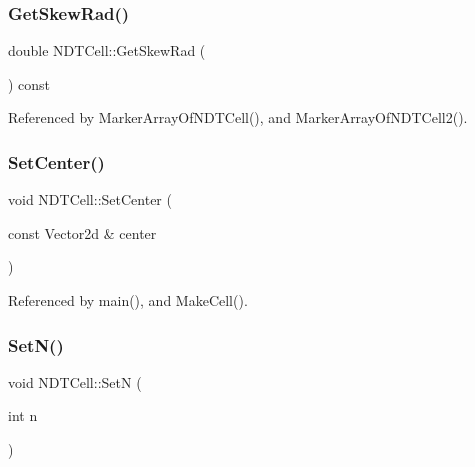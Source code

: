 \subsubsection{\texorpdfstring{Get\+Skew\+Rad()}{GetSkewRad()}}
{\footnotesize\ttfamily double N\+D\+T\+Cell\+::\+Get\+Skew\+Rad (\begin{DoxyParamCaption}{ }\end{DoxyParamCaption}) const\hspace{0.3cm}{\ttfamily [inline]}}



Referenced by Marker\+Array\+Of\+N\+D\+T\+Cell(), and Marker\+Array\+Of\+N\+D\+T\+Cell2().

\mbox{\label{classNDTCell_aa99d66a755f591c7d0859d3203e9fb5c}} 
\subsubsection{\texorpdfstring{Set\+Center()}{SetCenter()}}
{\footnotesize\ttfamily void N\+D\+T\+Cell\+::\+Set\+Center (\begin{DoxyParamCaption}\item[{const Vector2d \&}]{center }\end{DoxyParamCaption})\hspace{0.3cm}{\ttfamily [inline]}}



Referenced by main(), and Make\+Cell().

\mbox{\label{classNDTCell_a6d75aba8fc79b0f93da8f814114d8bd2}} 
\subsubsection{\texorpdfstring{Set\+N()}{SetN()}}
{\footnotesize\ttfamily void N\+D\+T\+Cell\+::\+SetN (\begin{DoxyParamCaption}\item[{int}]{n }\end{DoxyParamCaption})\hspace{0.3cm}{\ttfamily [inline]}}

\mbox{\label{classNDTCell_a5e0af0c81b4efc61bde2616993055b14}} 
